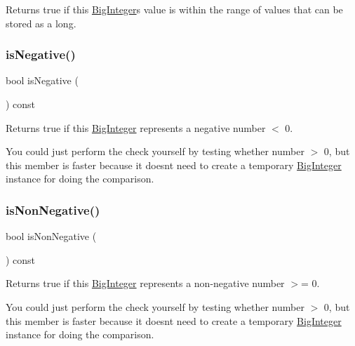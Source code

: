 Returns true if this \mbox{\hyperlink{classBigInteger}{Big\+Integer}}\textquotesingle{}s value is within the range of values that can be stored as a long. 

\mbox{\label{classBigInteger_ac14adf29c832575388e1b999a4bd60f5}} 
\subsubsection{\texorpdfstring{is\+Negative()}{isNegative()}}
{\footnotesize\ttfamily bool is\+Negative (\begin{DoxyParamCaption}{ }\end{DoxyParamCaption}) const}



Returns true if this \mbox{\hyperlink{classBigInteger}{Big\+Integer}} represents a negative number $<$ 0. 

You could just perform the check yourself by testing whether number $>$ 0, but this member is faster because it doesn\textquotesingle{}t need to create a temporary \mbox{\hyperlink{classBigInteger}{Big\+Integer}} instance for doing the comparison. \mbox{\label{classBigInteger_a2f8d83e07bed3c6477d597a01fc1213d}} 
\subsubsection{\texorpdfstring{is\+Non\+Negative()}{isNonNegative()}}
{\footnotesize\ttfamily bool is\+Non\+Negative (\begin{DoxyParamCaption}{ }\end{DoxyParamCaption}) const}



Returns true if this \mbox{\hyperlink{classBigInteger}{Big\+Integer}} represents a non-\/negative number $>$= 0. 

You could just perform the check yourself by testing whether number $>$ 0, but this member is faster because it doesn\textquotesingle{}t need to create a temporary \mbox{\hyperlink{classBigInteger}{Big\+Integer}} instance for doing the comparison. \mbox{\label{classBigInteger_acaa49d84bd269a22c83b15966a483572}} 
